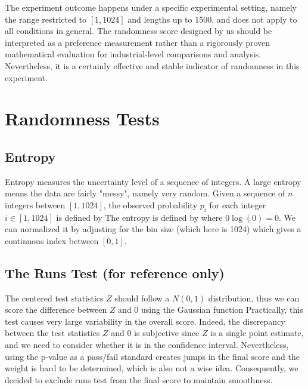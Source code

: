 \documentclass{report}
\begin{document}
The experiment outcome happens under a specific experimental setting, namely the range restricted to $[1,1024]$ and lengths up to 1500, and does not apply to all conditions in general. The randomness score designed by us should be interpreted as a preference measurement rather than a rigorously proven mathematical evaluation for industrial-level comparisons and analysis. Nevertheless, it is a certainly effective and stable indicator of randomness in this experiment.





\newpage
\appendix
\chapter{Randomness Tests}\label{app:RandTest}
\section{Entropy}\label{app:RandTests:Entropy}
Entropy \parencite{Entropy} measures the uncertainty level of a sequence of integers. A large entropy means the data are fairly "messy", namely very random. Given a sequence of $n$ integers between $[1,1024]$, the observed probability $p_i$ for each integer $i \in [1,1024]$ is defined by
The entropy is defined by
where $0\log(0)=0$. We can normalized it by adjusting for the bin size (which here is 1024)
which gives a continuous index between $[0,1]$.

\section{The Runs Test (for reference only)}
The centered test statistics $Z$ should follow a $N(0,1)$ distribution, thus we can score the difference between $Z$ and 0 using the Gaussian function
Practically, this test causes very large variability in the overall score. Indeed, the discrepancy between the test statistics $Z$ and 0 is subjective since $Z$ is a single point estimate, and we need to consider whether it is in the confidence interval. Nevertheless, using the p-value as a pass/fail standard creates jumps in the final score and the weight is hard to be determined, which is also not a wise idea. Consequently, we decided to exclude runs test from the final score to maintain smoothness.
\end{document}
